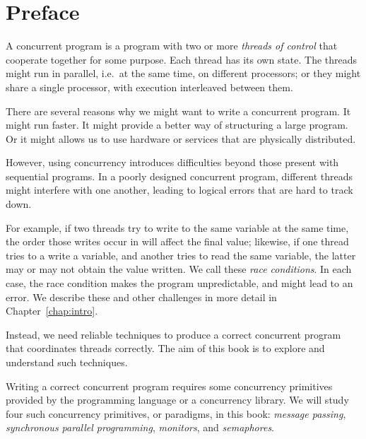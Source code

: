 \chapter*{Preface}

A concurrent program is a program with two or more \emph{threads of control}
that cooperate together for some purpose.  Each thread has its own state.  The
threads might run in parallel, i.e.~at the same time, on different processors;
or they might share a single processor, with execution interleaved between
them.

There are several reasons why we might want to write a concurrent program.  It
might run faster.  It might provide a better way of structuring a large
program.  Or it might allows us to use hardware or services that are
physically distributed.

However, using concurrency introduces difficulties beyond those present with
sequential programs.  In a poorly designed concurrent program, different
threads might interfere with one another, leading to logical errors that are
hard to track down.  

For example, if two threads try to write to the same variable at the same
time, the order those writes occur in will affect the final value; likewise,
if one thread tries to a write a variable, and another tries to read the same
variable, the latter may or may not obtain the value written.  We call these
\emph{race conditions}.  In each case, the race
condition makes the program unpredictable, and might lead to an error.  We
describe these and other challenges in more detail in
Chapter~\ref{chap:intro}.

Instead, we need reliable techniques to produce a correct concurrent program
that coordinates threads correctly.  The aim of this book is to explore and
understand such techniques.

Writing a correct concurrent program requires some concurrency
primitives
provided by the programming language or a concurrency library.  We will study
four such concurrency primitives, or paradigms, in this book: \emph{message
  passing}, \emph{synchronous parallel programming}, \emph{monitors}, and
\emph{semaphores}.

